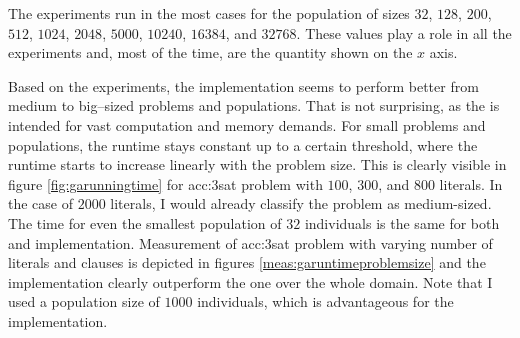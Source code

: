 The experiments run in the most cases for the population of sizes $32$, $128$, $200$, $512$, $1024$, $2048$, $5000$, $10240$, $16384$, and $32768$. These values play a role in all the experiments and, most of the time, are the quantity shown on the $x$ axis.

Based on the experiments, the \cuda implementation seems to perform better from medium to big--sized problems and populations. That is not surprising, as the \gpu is intended for vast computation and memory demands. For small problems and populations, the runtime stays constant up to a certain threshold, where the runtime starts to increase linearly with the problem size. This is clearly visible in figure \ref{fig:garunningtime} for \acrshort{acc:3sat} problem with $100$, $300$, and $800$ literals. In the case of $2000$ literals, I would already classify the problem as medium-sized. The time for even the smallest population of $32$ individuals is the same for both \cpu and \gpu implementation. Measurement of \acrshort{acc:3sat} problem with varying number of literals and clauses is depicted in figures \ref{meas:garuntimeproblemsize} and the \gpu implementation clearly outperform the \cpu one over the whole domain. Note that I used a population size of $1000$ individuals, which is advantageous for the \gpu implementation.

